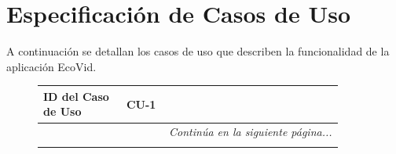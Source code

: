 \section{Especificación de Casos de Uso}
A continuación se detallan los casos de uso que describen la funcionalidad de la aplicación EcoVid.

\begin{figure}[H]
\begin{longtable}{p{0.25\linewidth} p{0.65\linewidth}}

    \toprule
    \textbf{ID del Caso de Uso} & CU-1 \\
    \midrule
    \endfirsthead



    \bottomrule
    \multicolumn{2}{r}{{\small\textit{Continúa en la siguiente página...}}} \\
    \endfoot

    \endlastfoot


\end{longtable}
\end{figure}
